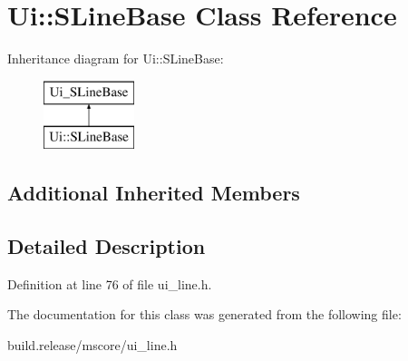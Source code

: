 \hypertarget{class_ui_1_1_s_line_base}{}\section{Ui\+:\+:S\+Line\+Base Class Reference}
\label{class_ui_1_1_s_line_base}
Inheritance diagram for Ui\+:\+:S\+Line\+Base\+:\begin{figure}[H]
\begin{center}
\leavevmode
\includegraphics[height=2.000000cm]{class_ui_1_1_s_line_base}
\end{center}
\end{figure}
\subsection*{Additional Inherited Members}


\subsection{Detailed Description}


Definition at line 76 of file ui\+\_\+line.\+h.



The documentation for this class was generated from the following file\+:\begin{DoxyCompactItemize}
\item 
build.\+release/mscore/ui\+\_\+line.\+h\end{DoxyCompactItemize}
